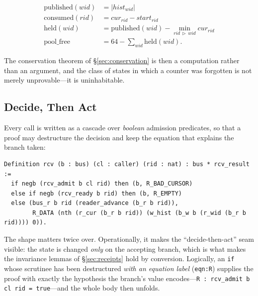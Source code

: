 \documentclass[10pt,journal,compsoc,twocolumn]{article}
\theoremstyle{definition}
\theoremstyle{remark}
\theoremstyle{plain}
\newcommand{\ctr}[1]{\texttt{#1}}
\begin{document}
\begin{equation}
\label{eq:accounting}
\begin{aligned}
\text{published}(\mathit{wid}) &= |\mathit{hist}_{\mathit{wid}}| \\
\text{consumed}(\mathit{rid})  &= \mathit{cur}_{\mathit{rid}} - \mathit{start}_{\mathit{rid}} \\
\mathrm{held}(\mathit{wid})    &= \text{published}(\mathit{wid}) - \textstyle\min_{\mathit{rid}\,\triangleright\,\mathit{wid}} \mathit{cur}_{\mathit{rid}} \\
\mathrm{pool\_free}            &= 64 - \textstyle\sum_{\mathit{wid}} \mathrm{held}(\mathit{wid}).
\end{aligned}
\end{equation}

The conservation theorem of \S\ref{sec:conservation} is then a computation rather than an argument, and the class of states in which a counter was forgotten is not merely unprovable---it is uninhabitable.

\subsection{Decide, Then Act}
\label{sec:decide}
Every call is written as a cascade over \emph{boolean} admission predicates, so that a proof may destructure the decision and keep the equation that explains the branch taken:

\begin{lstlisting}[language=Coq,caption={The five-line heart of \ctr{rcv}: three guards, three receipts, one state change.}]
Definition rcv (b : bus) (cl : caller) (rid : nat) : bus * rcv_result :=
  if negb (rcv_admit b cl rid) then (b, R_BAD_CURSOR)
  else if negb (rcv_ready b rid) then (b, R_EMPTY)
  else (bus_r b rid (reader_advance (b_r b rid)),
        R_DATA (nth (r_cur (b_r b rid)) (w_hist (b_w b (r_wid (b_r b rid)))) 0)).
\end{lstlisting}

The shape matters twice over. Operationally, it makes the ``decide-then-act'' seam visible: the state is changed \emph{only} on the accepting branch, which is what makes the invariance lemmas of \S\ref{sec:receipts} hold by conversion. Logically, an \lstinline|if| whose scrutinee has been destructured \emph{with an equation label} (\lstinline|eqn:R|) supplies the proof with exactly the hypothesis the branch's value encodes---\lstinline|R : rcv_admit b cl rid = true|---and the whole body then unfolds.
\end{document}
